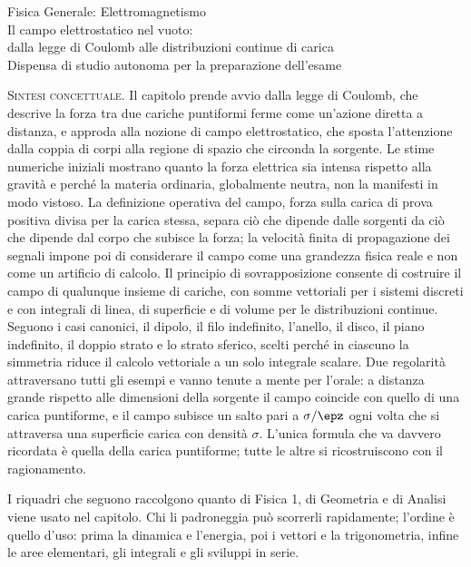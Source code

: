 \documentclass[main.tex]{subfiles}
\begin{document}
\renewcommand{\richiamoprefix}{Richiamo Matematico/Fisica 1 --- }


\begin{center}
{\Large Fisica Generale: Elettromagnetismo}\\[6pt]
{\large Il campo elettrostatico nel vuoto:\\ dalla legge di Coulomb alle distribuzioni continue di carica}\\[6pt]
Dispensa di studio autonoma per la preparazione dell'esame
\end{center}
\vspace{1ex}

\noindent\textsc{Sintesi concettuale.} Il capitolo prende avvio dalla legge di Coulomb, che descrive la forza tra due cariche puntiformi ferme come un'azione diretta a distanza, e approda alla nozione di campo elettrostatico, che sposta l'attenzione dalla coppia di corpi alla regione di spazio che circonda la sorgente. Le stime numeriche iniziali mostrano quanto la forza elettrica sia intensa rispetto alla gravità e perché la materia ordinaria, globalmente neutra, non la manifesti in modo vistoso. La definizione operativa del campo, forza sulla carica di prova positiva divisa per la carica stessa, separa ciò che dipende dalle sorgenti da ciò che dipende dal corpo che subisce la forza; la velocità finita di propagazione dei segnali impone poi di considerare il campo come una grandezza fisica reale e non come un artificio di calcolo. Il principio di sovrapposizione consente di costruire il campo di qualunque insieme di cariche, con somme vettoriali per i sistemi discreti e con integrali di linea, di superficie e di volume per le distribuzioni continue. Seguono i casi canonici, il dipolo, il filo indefinito, l'anello, il disco, il piano indefinito, il doppio strato e lo strato sferico, scelti perché in ciascuno la simmetria riduce il calcolo vettoriale a un solo integrale scalare. Due regolarità attraversano tutti gli esempi e vanno tenute a mente per l'orale: a distanza grande rispetto alle dimensioni della sorgente il campo coincide con quello di una carica puntiforme, e il campo subisce un salto pari a $\sigma/\epz$ ogni volta che si attraversa una superficie carica con densità $\sigma$. L'unica formula che va davvero ricordata è quella della carica puntiforme; tutte le altre si ricostruiscono con il ragionamento.

\medskip

I riquadri che seguono raccolgono quanto di Fisica 1, di Geometria e di Analisi viene usato nel capitolo. Chi li padroneggia può scorrerli rapidamente; l'ordine è quello d'uso: prima la dinamica e l'energia, poi i vettori e la trigonometria, infine le aree elementari, gli integrali e gli sviluppi in serie.
\end{document}
